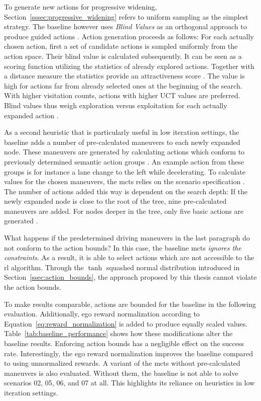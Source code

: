 To generate new actions for progressive widening, Section~\ref{sssec:progressive_widening} refers to uniform sampling as the simplest strategy. The baseline however uses \emph{Blind Values} as an orthogonal approach to produce guided actions \cite{couetouxImprovingExplorationUpper2012, kurzerDecentralizedCooperativePlanning2018}. Action generation proceeds as follows: For each actually chosen action, first a set of candidate actions is sampled uniformly from the action space. Their blind value is calculated subsequently. It can be seen as a scoring function utilizing the statistics of already explored actions. Together with a distance measure the statistics provide an attractiveness score \cite{kurzerDecentralizedCooperativePlanning2018}. The value is high for actions far from already selected ones at the beginning of the search. With higher visitation counts, actions with higher UCT values are preferred. Blind values thus weigh exploration versus exploitation for each actually expanded action \cite{kurzerDecentralizedCooperativePlanning2018}.

As a second heuristic that is particularly useful in low iteration settings, the baseline adds a number of pre-calculated maneuvers to each newly expanded node. These maneuvers are generated by calculating actions which conform to previously determined semantic action groups \cite{kurzerDecentralizedCooperativePlanning2018}. An example action from these groups is for instance a lane change to the left while decelerating. To calculate values for the chosen maneuvers, the \gls{mcts} relies on the scenario specification \cite{kurzerDecentralizedCooperativePlanning2018}. The number of actions added this way is dependent on the search depth: If the newly expanded node is close to the root of the tree, nine pre-calculated maneuvers are added. For nodes deeper in the tree, only five basic actions are generated \cite{kurzerDecentralizedCooperativePlanning2018}.

What happens if the predetermined driving maneuvers in the last paragraph do not conform to the action bounds? In this case, the baseline \gls{mcts} \emph{ignores the constraints}. As a result, it is able to select actions which are not accessible to the \gls{rl} algorithm. Through the $\tanh$ squashed normal distribution introduced in Section~\ref{ssec:action_bounds}, the approach proposed by this thesis cannot violate the action bounds.

To make results comparable, actions are bounded for the baseline in the following evaluation. Additionally, ego reward normalization according to Equation~\ref{eq:reward_normalization} is added to produce equally scaled values. Table~\ref{tab:baseline_performance} shows how these modifications alter the baseline results. Enforcing action bounds has a negligible effect on the success rate. Interestingly, the ego reward normalization improves the baseline compared to using unnormalized rewards. A variant of the \gls{mcts} without pre-calculated maneuvers is also evaluated. Without them, the baseline is not able to solve scenarios 02, 05, 06, and 07 at all. This highlights its reliance on heuristics in low iteration settings.

